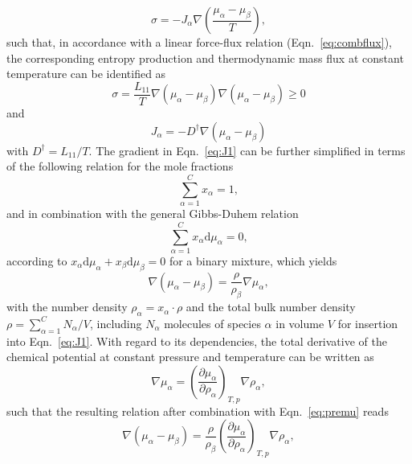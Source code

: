 \documentclass[aip,jcp,reprint]{revtex4-1}
\begin{document}
\begin{equation}
\label{eq:entropyprodsimple}
\sigma=-{{J}}_{\alpha}{ \nabla}\left(\frac{\mu_{\alpha}-\mu_{\beta}}{T}\right),
\end{equation}
such that, in accordance with a linear force-flux relation (Eqn.~\eqref{eq:combflux}), the corresponding entropy production and thermodynamic mass flux at constant temperature can be identified  as
\begin{equation}
\sigma=\frac{L_{11}}{T}{\nabla}\left(\mu_{\alpha}-\mu_{\beta}\right){ \nabla}\left(\mu_{\alpha}-\mu_{\beta}\right)\geq 0
\end{equation}
and
\begin{equation}
\label{eq:J1}
J_{\alpha}=-D^{\dag}{ \nabla}\left(\mu_{\alpha}-\mu_{\beta}\right)
\end{equation}
with $D^{\dag}=L_{11}/T$. 
The gradient in Eqn.~\eqref{eq:J1}  can be further simplified in terms of the following
relation for the mole fractions 
\begin{equation}
\label{eq:hats}
\sum_{\alpha=1}^C x_{\alpha}=1,
\end{equation}
and in combination with the general Gibbs-Duhem relation \cite{atkins10a} 
\begin{equation}
\label{eq:gidu}
\sum_{\alpha=1}^C x_{\alpha}\textrm{d}\mu_{\alpha}=0,
\end{equation}
according to
$x_{\alpha}\text{d}\mu_{\alpha} + x_{\beta}\text{d}\mu_{\beta}=0$
for a binary mixture, which yields 
\begin{equation}
\label{eq:premu}
{ \nabla}(\mu_{\alpha}-\mu_{\beta}) = \frac{\rho}{\rho_{\beta}}{\nabla}\mu_{\alpha},
\end{equation}
with the number density $\rho_{\alpha} = x_{\alpha}\cdot \rho$ and the total bulk number density $\rho=\sum_{\alpha=1}^CN_{\alpha}/V$, including $N_{\alpha}$ molecules of species $\alpha$ in volume $V$
for insertion into Eqn.~\eqref{eq:J1}. 
With regard to its dependencies, the total derivative of the chemical potential at constant pressure and temperature can be written as 
 \begin{equation}
\label{eq:expansion}
{\nabla}\mu_{\alpha} =
 \left(\frac{\partial \mu_{\alpha}}{\partial \rho_{\alpha}}\right)_{T,p}  {\nabla}\rho_{\alpha},
\end{equation}
such that the resulting relation  after combination with Eqn.~\eqref{eq:premu} reads
 \begin{equation}
{ \nabla}(\mu_{\alpha}-\mu_{\beta}) = \frac{\rho}{\rho_{\beta}}\left(\frac{\partial \mu_{\alpha}}{\partial \rho_{\alpha}}\right)_{T,p} {\nabla}\rho_{\alpha},
\end{equation}
\end{document}
